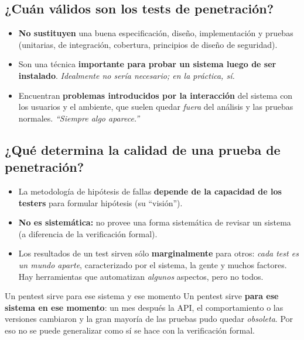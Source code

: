 \documentclass[11pt,a4paper]{article}
\begin{document}
\subsection{¿Cuán válidos son los tests de penetración?}
\begin{itemize}[leftmargin=1.6em,itemsep=2pt]
  \item \textbf{No sustituyen} una buena especificación, diseño, implementación y pruebas
        (unitarias, de integración, cobertura, principios de diseño de seguridad).
  \item Son una técnica \textbf{importante para probar un sistema luego de ser instalado}.
        \emph{Idealmente no sería necesario; en la práctica, sí.}
  \item Encuentran \textbf{problemas introducidos por la interacción} del sistema con los
        usuarios y el ambiente, que suelen quedar \emph{fuera} del análisis y las pruebas
        normales. \emph{``Siempre algo aparece.''}
\end{itemize}

\subsection{¿Qué determina la calidad de una prueba de penetración?}
\begin{itemize}[leftmargin=1.6em,itemsep=2pt]
  \item La metodología de hipótesis de fallas \textbf{depende de la capacidad de los testers}
        para formular hipótesis (su ``visión'').
  \item \textbf{No es sistemática:} no provee una forma sistemática de revisar un sistema (a
        diferencia de la verificación formal).
  \item Los resultados de un test sirven sólo \textbf{marginalmente} para otros:
        \emph{cada test es un mundo aparte}, caracterizado por el sistema, la gente y muchos
        factores. Hay herramientas que automatizan \emph{algunos} aspectos, pero no todos.
\end{itemize}

\begin{warnbox}{Un pentest sirve para ese sistema y ese momento}
Un pentest sirve \textbf{para ese sistema en ese momento}: un mes después la API, el
comportamiento o las versiones cambiaron y la gran mayoría de las pruebas pudo quedar
\emph{obsoleta}. Por eso no se puede generalizar como sí se hace con la verificación formal.
\end{warnbox}
\end{document}
